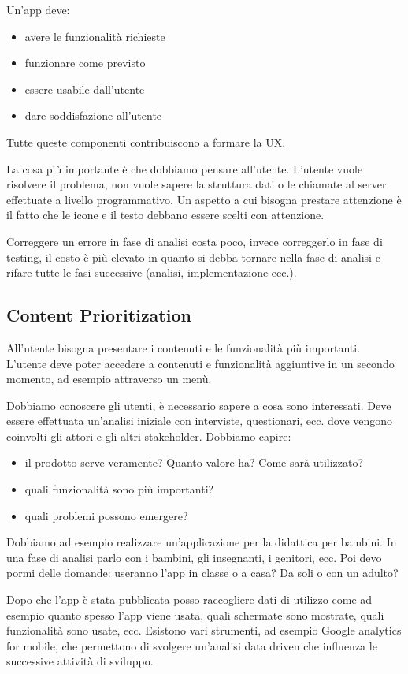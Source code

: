 Un'app deve: 
\begin{itemize}
    \item avere le funzionalità richieste
    \item funzionare come previsto
    \item essere usabile dall'utente
    \item dare soddisfazione all'utente
\end{itemize}
Tutte queste componenti contribuiscono a formare la UX.

La cosa più importante è che dobbiamo pensare all'utente. 
L'utente vuole risolvere il problema, non vuole sapere la struttura dati o le chiamate al server effettuate a livello programmativo. 
Un aspetto a cui bisogna prestare attenzione è il fatto che le icone e il testo debbano essere scelti con attenzione.

Correggere un errore in fase di analisi costa poco, invece correggerlo in fase di testing, il costo è più elevato in quanto si debba tornare nella fase di analisi e rifare tutte le fasi successive (analisi, implementazione ecc.).

\subsection{Content Prioritization}
All’utente bisogna presentare i contenuti e le funzionalità più importanti. 
L’utente deve poter accedere a contenuti e funzionalità aggiuntive in un secondo momento, ad esempio attraverso un menù. 

Dobbiamo conoscere gli utenti, è necessario sapere a cosa sono interessati. Deve essere effettuata un'analisi iniziale con interviste, questionari, ecc. dove vengono coinvolti gli attori e gli altri stakeholder.
Dobbiamo capire: 
\begin{itemize}
    \item il prodotto serve veramente? Quanto valore ha? Come sarà utilizzato? 
    \item quali funzionalità sono più importanti? 
    \item quali problemi possono emergere? 
\end{itemize}

Dobbiamo ad esempio realizzare un'applicazione per la didattica per bambini. In una fase di analisi parlo con i bambini, gli insegnanti, i genitori, ecc. Poi devo pormi delle domande: useranno l’app in classe o a casa? Da soli o con un adulto? 

Dopo che l’app è stata pubblicata posso raccogliere dati di utilizzo come ad esempio quanto spesso l’app viene usata, quali schermate sono mostrate, quali funzionalità sono usate, ecc.
Esistono vari strumenti, ad esempio Google analytics for mobile, che permettono di svolgere un’analisi data driven che influenza le successive attività di sviluppo.

